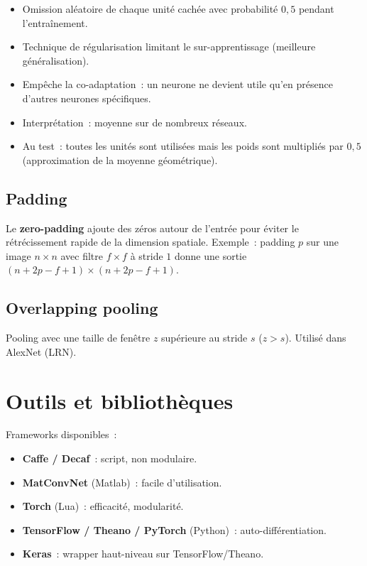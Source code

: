 \documentclass[a4paper,11pt]{article}
\theoremstyle{definition}
\theoremstyle{remark}
\begin{document}
\begin{itemize}
  \item Omission al\'eatoire de chaque unit\'e cach\'ee avec
    probabilit\'e $0{,}5$ pendant l'entra\^inement.
  \item Technique de r\'egularisation limitant le sur-apprentissage
    (meilleure g\'en\'eralisation).
  \item Emp\^eche la co-adaptation~: un neurone ne devient utile
    qu'en pr\'esence d'autres neurones sp\'ecifiques.
  \item Interpr\'etation~: moyenne sur de nombreux r\'eseaux.
  \item Au test~: toutes les unit\'es sont utilis\'ees mais les
    poids sont multipli\'es par $0{,}5$ (approximation de la
    moyenne g\'eom\'etrique).
\end{itemize}

\subsection{Padding}

Le \textbf{zero-padding} ajoute des z\'eros autour de l'entr\'ee
pour \'eviter le r\'etr\'ecissement rapide de la dimension
spatiale. Exemple~: padding $p$ sur une image $n\times n$ avec
filtre $f\times f$ \`a stride $1$ donne une sortie
$(n + 2p - f + 1) \times (n + 2p - f + 1)$.

\subsection{Overlapping pooling}

Pooling avec une taille de fen\^etre $z$ sup\'erieure au stride $s$
($z > s$). Utilis\'e dans AlexNet (LRN).

\section{Outils et biblioth\`eques}

Frameworks disponibles~:
\begin{itemize}
  \item \textbf{Caffe / Decaf}~: script, non modulaire.
  \item \textbf{MatConvNet} (Matlab)~: facile d'utilisation.
  \item \textbf{Torch} (Lua)~: efficacit\'e, modularit\'e.
  \item \textbf{TensorFlow / Theano / PyTorch} (Python)~:
    auto-diff\'erentiation.
  \item \textbf{Keras}~: wrapper haut-niveau sur TensorFlow/Theano.
\end{itemize}
\end{document}
